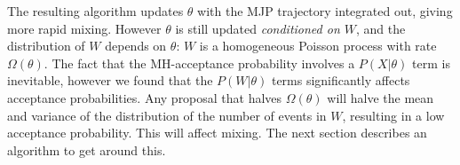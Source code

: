 The resulting algorithm updates $\theta$ with the MJP trajectory 
integrated out, giving more rapid mixing.
However $\theta$ is still updated {\em conditioned on
$W$}, and 
the distribution of $W$ depends on $\theta$: 
$W$ is a homogeneous
Poisson process with rate $\Omega(\theta)$. %
The fact that the MH-acceptance probability involves a $P(X|\theta)$ term
is inevitable, however we found that the $P(W|\theta)$
terms significantly affects acceptance probabilities. 
Any proposal that halves $\Omega(\theta)$ will halve the
mean and variance of the distribution of the number of events in $W$, 
resulting in a low acceptance probability.
This will affect mixing.
The next section describes an algorithm to get around this.
\vspace{-.1in}
